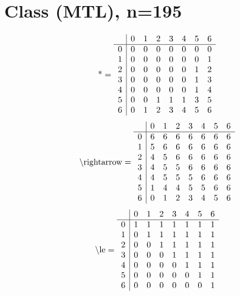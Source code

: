 \documentclass[11pt]{article}
\begin{document}
\section{Class (MTL), n=195}
\[\text{*} = 
\begin{array}{r | r r r r r r r}
 & 0 & 1 & 2 & 3 & 4 & 5 & 6 \\ \hline
0 & 0 & 0 & 0 & 0 & 0 & 0 & 0 \\
1 & 0 & 0 & 0 & 0 & 0 & 0 & 1 \\
2 & 0 & 0 & 0 & 0 & 0 & 1 & 2 \\
3 & 0 & 0 & 0 & 0 & 0 & 1 & 3 \\
4 & 0 & 0 & 0 & 0 & 0 & 1 & 4 \\
5 & 0 & 0 & 1 & 1 & 1 & 3 & 5 \\
6 & 0 & 1 & 2 & 3 & 4 & 5 & 6 \\
\end{array}
\]
\[\text{\textbackslash rightarrow} = 
\begin{array}{r | r r r r r r r}
 & 0 & 1 & 2 & 3 & 4 & 5 & 6 \\ \hline
0 & 6 & 6 & 6 & 6 & 6 & 6 & 6 \\
1 & 5 & 6 & 6 & 6 & 6 & 6 & 6 \\
2 & 4 & 5 & 6 & 6 & 6 & 6 & 6 \\
3 & 4 & 5 & 5 & 6 & 6 & 6 & 6 \\
4 & 4 & 5 & 5 & 5 & 6 & 6 & 6 \\
5 & 1 & 4 & 4 & 5 & 5 & 6 & 6 \\
6 & 0 & 1 & 2 & 3 & 4 & 5 & 6 \\
\end{array}
\]
\[\text{\textbackslash le} = 
\begin{array}{r | r r r r r r r}
 & 0 & 1 & 2 & 3 & 4 & 5 & 6 \\ \hline
0 & 1 & 1 & 1 & 1 & 1 & 1 & 1 \\
1 & 0 & 1 & 1 & 1 & 1 & 1 & 1 \\
2 & 0 & 0 & 1 & 1 & 1 & 1 & 1 \\
3 & 0 & 0 & 0 & 1 & 1 & 1 & 1 \\
4 & 0 & 0 & 0 & 0 & 1 & 1 & 1 \\
5 & 0 & 0 & 0 & 0 & 0 & 1 & 1 \\
6 & 0 & 0 & 0 & 0 & 0 & 0 & 1 \\
\end{array}
\]
\end{document}
